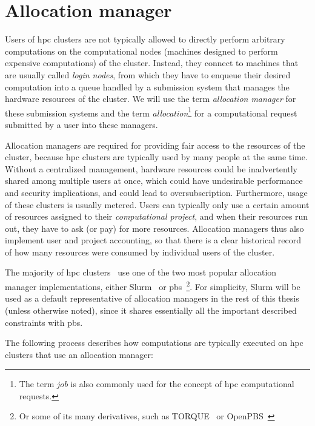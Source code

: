 \section{Allocation manager}
\label{challenge:allocation-manager}
Users of \gls{hpc} clusters are not typically allowed to directly perform arbitrary
computations on the computational nodes (machines designed to perform expensive computations) of
the cluster. Instead, they connect to machines that are usually called \emph{login nodes},
from which they have to enqueue their desired computation into a queue handled by a submission
system that manages the hardware resources of the cluster. We will use the term
\emph{allocation manager} for these submission systems and the term
\emph{allocation}\footnote{The term \emph{job} is also commonly used for the concept of \gls{hpc}
computational requests.} for a computational request submitted by a user into
these managers.

Allocation managers are required for providing fair access to the resources of the cluster, because
\gls{hpc} clusters are typically used by many people at the same time. Without a
centralized management, hardware resources could be inadvertently shared among multiple users at
once, which could have undesirable performance and security implications, and could lead to
oversubscription. Furthermore, usage of these clusters is usually metered. Users can typically only
use a certain amount of resources assigned to their \emph{computational project}, and when their
resources run out, they have to ask (or pay) for more resources. Allocation managers thus also
implement user and project accounting, so that there is a clear historical record of how many
resources were consumed by individual users of the cluster.

The majority of \gls{hpc} clusters~\cite{slurm-schedmd} use one of the two most
popular allocation manager implementations, either Slurm~\cite{slurm} or
\gls{pbs}~\cite{pbs}\footnote{Or some of its many derivatives,
such as TORQUE~\cite{torque} or OpenPBS~\cite{openpbs}}. For simplicity, Slurm will
be used as a default representative of allocation managers in the rest of this thesis (unless
otherwise noted), since it shares essentially all the important described constraints with
\gls{pbs}.

The following process describes how computations are typically executed on \gls{hpc}
clusters that use an allocation manager:


